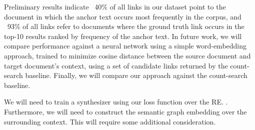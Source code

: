 \documentclass{article}
\begin{document}
Preliminary results indicate ~40\% of all links in our dataset point to the document in which the anchor text occurs most frequently in the corpus, and ~93\% of all links refer to documents where the ground truth link occurs in the top-10 results ranked by frequency of the anchor text. In future work, we will compare performance against a neural network using a simple word-embedding approach, trained to minimize cosine distance between the source document and target document's context, using a set of candidate links returned by the count-search baseline. Finally, we will compare our approach against the count-search baseline.

We will need to train a synthesizer using our loss function over the RE. . Furthermore, we will need to construct the semantic graph embedding over the surrounding context. This will require some additional consideration.

\clearpage
\newpage



\end{document}
